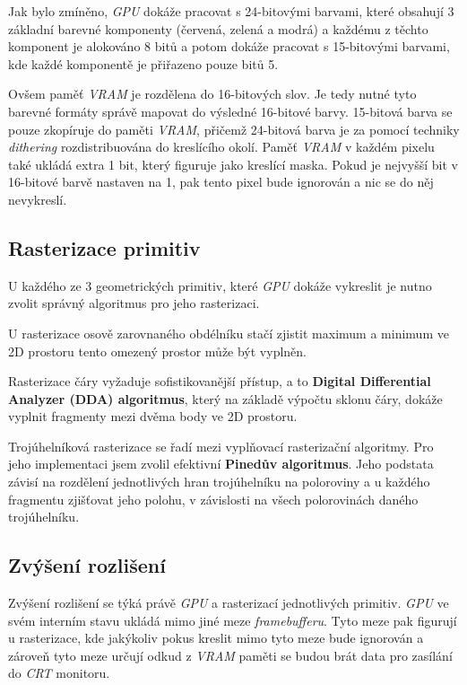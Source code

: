 Jak bylo zmíněno, \textit{GPU} dokáže pracovat s 24-bitovými barvami, které obsahují 3 základní barevné komponenty (červená, zelená a modrá) a
každému z těchto komponent je alokováno 8 bitů a potom dokáže pracovat s 15-bitovými barvami, kde každé komponentě je
přiřazeno pouze bitů 5. 

Ovšem paměť \textit{VRAM} je rozdělena do 16-bitových slov. Je tedy nutné tyto barevné formáty správě mapovat do výsledné 16-bitové barvy.
15-bitová barva se pouze zkopíruje do paměti \textit{VRAM}, přičemž 24-bitová barva je za pomocí techniky \textit{dithering} rozdistribuována
do kreslícího okolí. Paměť \textit{VRAM} v každém pixelu také ukládá extra 1 bit, který figuruje jako kreslící maska. Pokud je nejvyšší bit
v 16-bitové barvě nastaven na 1, pak tento pixel bude ignorován a nic se do něj nevykreslí.

\subsection{Rasterizace primitiv}

U každého ze 3 geometrických primitiv, které \textit{GPU} dokáže vykreslit je nutno zvolit správný algoritmus pro jeho rasterizaci.

U rasterizace osově zarovnaného obdélníku stačí zjistit maximum a minimum ve 2D prostoru tento omezený prostor může být vyplněn.

Rasterizace čáry vyžaduje sofistikovanější přístup, a to \textbf{Digital Differential Analyzer (DDA) algoritmus}, který na základě výpočtu
sklonu čáry, dokáže vyplnit fragmenty mezi dvěma body ve 2D prostoru.

Trojúhelníková rasterizace se řadí mezi vyplňovací rasterizační algoritmy. Pro jeho implementaci jsem zvolil efektivní \textbf{Pinedův algoritmus}.
Jeho podstata závisí na rozdělení jednotlivých hran trojúhelníku na poloroviny a u každého fragmentu zjišťovat jeho polohu, v závislosti na
všech polorovinách daného trojúhelníku.

\subsection{Zvýšení rozlišení}

Zvýšení rozlišení se týká právě \textit{GPU} a rasterizací jednotlivých primitiv. \textit{GPU} ve svém interním stavu
ukládá mimo jiné meze \textit{framebufferu}. Tyto meze pak figurují u rasterizace, kde jakýkoliv pokus kreslit mimo tyto meze
bude ignorován a zároveň tyto meze určují odkud z \textit{VRAM} paměti se budou brát data pro zasílání do \textit{CRT} monitoru.

